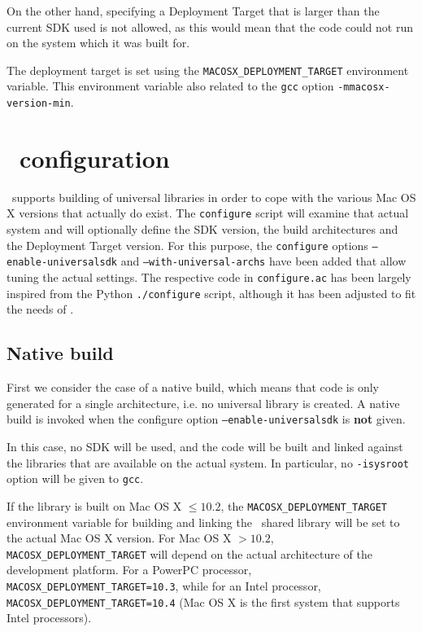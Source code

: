 \documentclass{article}[12pt,a4]
\begin{document}
On the other hand, specifying a Deployment Target that is larger than the current SDK used 
is not allowed, as this would mean that the code could not run on the system which it was 
built for.

The deployment target is set using the {\tt MACOSX\_DEPLOYMENT\_TARGET}
environment variable.
This environment variable also related to the {\tt gcc} option {\tt -mmacosx-version-min}.


\section{\this\ configuration}

\this\ supports building of universal libraries in order to cope with the various Mac OS X versions
that actually do exist.
The {\tt configure} script will examine that actual system and will optionally define the
SDK version, the build architectures and the Deployment Target version.
For this purpose, the {\tt configure} options {\tt --enable-universalsdk} and {\tt --with-universal-archs}
have been added that allow tuning the actual settings.
The respective code in {\tt configure.ac} has been largely inspired from the Python {\tt ./configure} 
script, although it has been adjusted to fit the needs of \this.

\subsection{Native build}

First we consider the case of a native build, which means that code is only generated for a single
architecture, i.e. no universal library is created.
A native build is invoked when the configure option {\tt --enable-universalsdk} is {\bf not} given.

In this case, no SDK will be used, and the code will be built and linked against the libraries that
are available on the actual system.
In particular, no {\tt -isysroot} option will be given to {\tt gcc}.

If the library is built on Mac OS X $\le10.2$, the
{\tt MACOSX\_DEPLOYMENT\_TARGET}
environment variable for building and linking the \this\ shared library will be set to the actual 
Mac OS X version.
For Mac OS X $>10.2$, {\tt MACOSX\_DEPLOYMENT\_TARGET} will depend on the actual
architecture of the development platform.
For a PowerPC processor, {\tt MACOSX\_DEPLOYMENT\_TARGET=10.3}, while for an Intel
processor, {\tt MACOSX\_DEPLOYMENT\_TARGET=10.4} (Mac OS X is the first system that
supports Intel processors).
\end{document}
